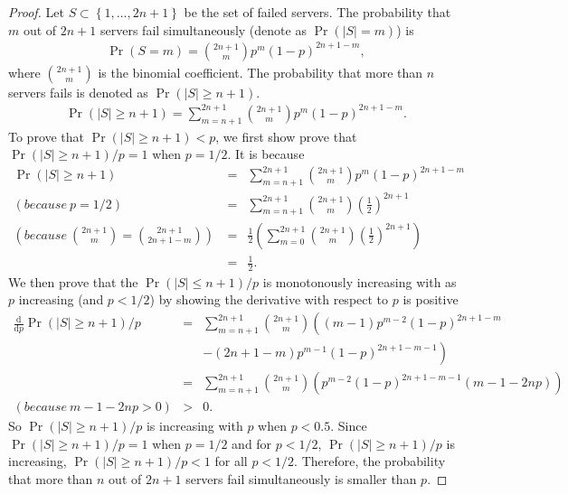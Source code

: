 \documentclass[11pt]{article}
\begin{document}
\begin{proof}
    Let $S \subset \left\{1,\ldots,2n+1\right\}$ be the set of failed servers.
    The probability that $m$ out of $2n+1$ servers fail simultaneously (denote as $\Pr(|S|=m)$) is 
    \begin{eqnarray*}
        \Pr(S=m) = \binom{2n+1}{m} p^{m} (1-p)^{2n+1-m},
    \end{eqnarray*}
    where $\binom{2n+1}{m}$ is the binomial coefficient.
    The probability that more than $n$ servers fails is denoted as $\Pr(|S|\geq n+1)$.
    \begin{eqnarray*}
        \Pr\left(|S|\geq n+1\right) = \sum_{m=n+1}^{2n+1} \binom{2n+1}{m} p^{m} (1-p)^{2n+1-m}.
    \end{eqnarray*}
    To prove that $\Pr(|S|\geq n+1) < p$, we first show prove that $\Pr(|S|\geq n+1)/p = 1$ 
    when $p=1/2$. It is because
    \begin{eqnarray*}
        \Pr(|S|\geq n+1) &=& \sum_{m=n+1}^{2n+1} \binom{2n+1}{m} p^{m} (1-p)^{2n+1-m} \\ 
        (because~p=1/2)~&=& \sum_{m=n+1}^{2n+1} \binom{2n+1}{m} \left(\frac{1}{2}\right)^{2n+1} \\
        \left(because~\binom{2n+1}{m}=\binom{2n+1}{2n+1-m}\right)~&=& \frac{1}{2}\left(  \sum_{m=0}^{2n+1} 
        \binom{2n+1}{m} \left(\frac{1}{2}\right)^{2n+1} \right) \\
        &=& \frac{1}{2}.
    \end{eqnarray*}
    We then prove that the $\Pr(|S|\leq n+1)/p$ is monotonously increasing with as $p$ 
    increasing (and $p<1/2$) by showing the derivative with respect to $p$ is positive
    \begin{eqnarray*}
        \frac{\mathrm{d}}{\mathrm{d}p}\Pr(|S|\geq n+1)/p &=& \sum_{m=n+1}^{2n+1} \binom{2n+1}{m} \left(\left(m-1\right)p^{m-2}
        \left(1-p\right)^{2n+1-m} \right.\\
        &&\left. - \left(2n+1-m\right)p^{m-1}\left(1-p\right)^{2n+1-m-1}\right) \\
        &=& \sum_{m=n+1}^{2n+1} \binom{2n+1}{m} \left(p^{m-2} 
        \left(1-p\right)^{2n+1-m-1}\left(m-1-2np\right)\right)\\
        (because~m-1-2np>0)&>& 0.
    \end{eqnarray*}
    So $\Pr(|S|\geq n+1)/p$ is increasing with $p$ when $p<0.5$.
    Since $\Pr(|S|\geq n+1)/p=1$ when $p=1/2$ and for $p<1/2$, $\Pr(|S|\geq n+1)/p$ is 
    increasing, $\Pr(|S|\geq n+1)/p < 1$ for all $p<1/2$. Therefore, the probability 
    that more than $n$ out of $2n+1$ servers fail simultaneously is smaller than 
    $p$.
\end{proof}

{}

\end{document}
